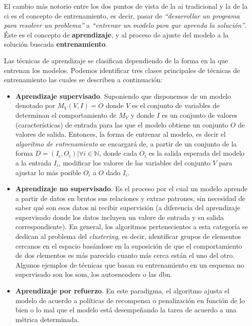 El cambio más notorio entre los dos puntos de vista de la \gls{ai} tradicional y la de la \gls{ci} es el concepto de entrenamiento, es decir, pasar de \textit{\enquote{desarrollar un programa para resolver un problema}} a \textit{\enquote{entrenar un modelo para que aprenda la solución}}. Éste es el concepto de \textbf{aprendizaje}, y al proceso de ajuste del modelo a la solución buscada \textbf{entrenamiento}.

Las técnicas de aprendizaje se clasifican dependiendo de la forma en la que entrenan los modelos. Podemos identificar tres clases principales de técnicas de entrenamiento las cuales se describen a continuación:

\begin{itemize}
	\item \textbf{Aprendizaje supervisado}. Suponiendo que disponemos de un modelo denotado por $M_V(V, I) = O$ donde $V$ es el conjunto de variables de determinan el comportamiento de $M_V$ y donde $I$ es un conjunto de valores (características) de entrada para las que el modelo obtiene un conjunto $O$ de valores de salida. Entonces, la forma de entrenar al modelo, es decir el \textit{algoritmo de entrenamiento} se encargará de, a partir de un conjunto de la forma $D = {(I_i, O_i) | \forall i \in \mathbb{N}}$, donde cada $O_i$ es la salida esperada del modelo a la entrada $I_i$, modificar los valores de las variables del conjunto $V$ para ajustar lo más posible $O_i$ a $O$ dado $I_i$.
	\item \textbf{Aprendizaje no supervisado}. Es el proceso por el cual un modelo aprende a partir de datos en brutos sus relaciones y extrae patrones, sin necesidad de saber qué son esos datos ni recibir supervisión (a diferencia del aprendizaje supervisado donde los datos incluyen un valore de entrada y su salida correspondiente). En general, los algoritmos pertenecientes a esta categoría se dedican al problema del \textit{clustering}, es decir, identificar grupos de elementos cercanos en el espacio basándose en la suposición de que el comportamiento de dos elementos es más parecido cuanto más cerca están el uno del otro. Algunos ejemplos de técnicas que basan su entrenamiento en un esquema no supervisado son los \gls{som}, los autoencoders o las \gls{dbn}.
	\item \textbf{Aprendizaje por refuerzo}. En este paradigma, el algoritmo ajusta el modelo de acuerdo a políticas de recompensa o penalización en función de lo bien o lo mal que el modelo está desempeñando la tarea de acuerdo a una métrica determinada. 
\end{itemize}

